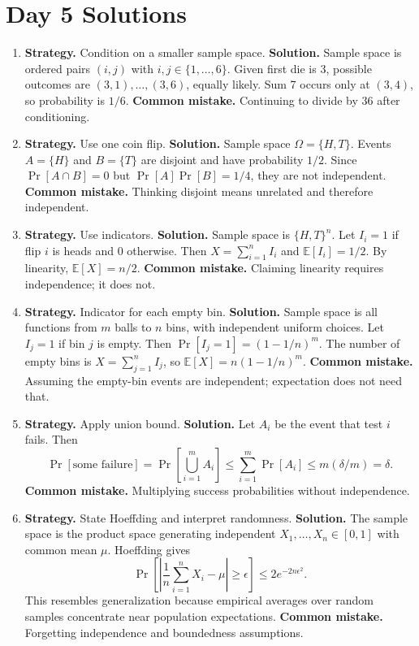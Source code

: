 \documentclass[11pt]{article}
\begin{document}
\section{Day 5 Solutions}
\begin{enumerate}[label=\textbf{5.\arabic*.}]
\item \textbf{Strategy.} Condition on a smaller sample space. \textbf{Solution.} Sample space is ordered pairs $(i,j)$ with $i,j\in\{1,\ldots,6\}$. Given first die is 3, possible outcomes are $(3,1),\ldots,(3,6)$, equally likely. Sum 7 occurs only at $(3,4)$, so probability is $1/6$. \textbf{Common mistake.} Continuing to divide by 36 after conditioning.

\item \textbf{Strategy.} Use one coin flip. \textbf{Solution.} Sample space $\Omega=\{H,T\}$. Events $A=\{H\}$ and $B=\{T\}$ are disjoint and have probability $1/2$. Since $\Pr[A\cap B]=0$ but $\Pr[A]\Pr[B]=1/4$, they are not independent. \textbf{Common mistake.} Thinking disjoint means unrelated and therefore independent.

\item \textbf{Strategy.} Use indicators. \textbf{Solution.} Sample space is $\{H,T\}^n$. Let $I_i=1$ if flip $i$ is heads and $0$ otherwise. Then $X=\sum_{i=1}^n I_i$ and $\mathbb{E}[I_i]=1/2$. By linearity, $\mathbb{E}[X]=n/2$. \textbf{Common mistake.} Claiming linearity requires independence; it does not.

\item \textbf{Strategy.} Indicator for each empty bin. \textbf{Solution.} Sample space is all functions from $m$ balls to $n$ bins, with independent uniform choices. Let $I_j=1$ if bin $j$ is empty. Then $\Pr[I_j=1]=(1-1/n)^m$. The number of empty bins is $X=\sum_{j=1}^n I_j$, so $\mathbb{E}[X]=n(1-1/n)^m$. \textbf{Common mistake.} Assuming the empty-bin events are independent; expectation does not need that.

\item \textbf{Strategy.} Apply union bound. \textbf{Solution.} Let $A_i$ be the event that test $i$ fails. Then
\[
\Pr[\text{some failure}]=\Pr\left[\bigcup_{i=1}^m A_i\right]\le\sum_{i=1}^m\Pr[A_i]\le m(\delta/m)=\delta.
\]
\textbf{Common mistake.} Multiplying success probabilities without independence.

\item \textbf{Strategy.} State Hoeffding and interpret randomness. \textbf{Solution.} The sample space is the product space generating independent $X_1,\ldots,X_n\in[0,1]$ with common mean $\mu$. Hoeffding gives
\[
\Pr\left[\left|\frac1n\sum_{i=1}^n X_i-\mu\right|\ge\epsilon\right]\le2e^{-2n\epsilon^2}.
\]
This resembles generalization because empirical averages over random samples concentrate near population expectations. \textbf{Common mistake.} Forgetting independence and boundedness assumptions.
\end{enumerate}
\end{document}
